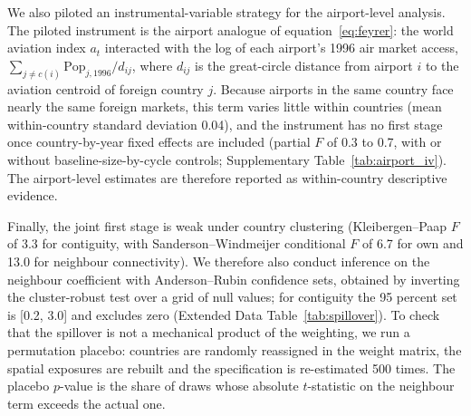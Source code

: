 We also piloted an instrumental-variable strategy for the airport-level analysis. The piloted instrument is the airport analogue of equation~\ref{eq:feyrer}: the world aviation index $a_t$ interacted with the log of each airport's 1996 air market access, $\sum_{j\neq c(i)}\mathrm{Pop}_{j,1996}/d_{ij}$, where $d_{ij}$ is the great-circle distance from airport $i$ to the aviation centroid of foreign country $j$. Because airports in the same country face nearly the same foreign markets, this term varies little within countries (mean within-country standard deviation 0.04), and the instrument has no first stage once country-by-year fixed effects are included (partial $F$ of 0.3 to 0.7, with or without baseline-size-by-cycle controls; Supplementary Table~\ref{tab:airport_iv}). The airport-level estimates are therefore reported as within-country descriptive evidence.


Finally, the joint first stage is weak under country clustering (Kleibergen--Paap $F$ of 3.3 for contiguity, with Sanderson--Windmeijer conditional $F$ of 6.7 for own and 13.0 for neighbour connectivity). We therefore also conduct inference on the neighbour coefficient with Anderson--Rubin confidence sets, obtained by inverting the cluster-robust test over a grid of null values; for contiguity the 95 percent set is [0.2, 3.0] and excludes zero (Extended Data Table~\ref{tab:spillover}). To check that the spillover is not a mechanical product of the weighting, we run a permutation placebo: countries are randomly reassigned in the weight matrix, the spatial exposures are rebuilt and the specification is re-estimated 500 times. The placebo $p$-value is the share of draws whose absolute $t$-statistic on the neighbour term exceeds the actual one.


